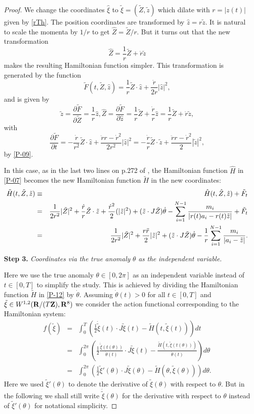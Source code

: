 \documentclass[11pt]{article}
\def\be{\begin{equation}}
\def\ee{\end{equation}}
\def\bea{\begin{eqnarray}}
\def\eea{\end{eqnarray}}
\def\nn{\nonumber}
\def\lb{\label}
\def\pt{\partial}
\def\R{{\bf R}}
\def\Z{{\bf Z}}
\def\th{{\theta}}
\def\td#1{\tilde{#1}}
\begin{document}
\begin{proof}
  We change the coordinates $\hat{\xi}$ to
  $\td{\xi}=(\td{Z},\td{z})$
  which dilate with $r=|z(t)|$ given by \eqref{rTh}. The position coordinates are transformed by $\hat{z} = r\td{z}$.
  It is natural to scale the momenta by $1/r$ to get $\hat{Z}=\td{Z}/r$. 
  But it
  turns out that the new transformation
  \be  \hat{Z}=\frac{1}{r}\td{Z}+\dot{r}\td{z}  \lb{P-09}\ee
  makes the resulting Hamiltonian function simpler. 
  This transformation is generated by the function
  \be  \td{F}(t, \td{Z}, \hat{z})
    = \frac{1}{r}\td{Z}\cdot\hat{z} + \frac{\dot{r}}{2r}|\hat{z}|^2,
                          \lb{P-10}\ee
  and is given by
  \be
  \td{z} = \frac{\pt \td{F}}{\pt \td{Z}} = \frac{1}{r}\hat{z},   
  \hat{Z} = \frac{\pt \td{F}}{\pt \hat{z}} = \frac{1}{r}\td{Z}+\frac{\dot{r}}{r}\hat{z} = \frac{1}{r}\td{Z}+\dot{r}\td{z}, \nn\ee
  with
  \be  \frac{\pt \td{F}}{\pt t}
  = -\frac{\dot{r}}{r^2}\td{Z}\cdot\hat{z}
         + \frac{\ddot{r}r-\dot{r}^2}{2r^2}|\hat{z}|^2
  = -\frac{\dot{r}}{r}\td{Z}\cdot\td{z}
         + \frac{\ddot{r}r-\dot{r}^2}{2}|\td{z}|^2,     \lb{P-11}\ee
  by \eqref{P-09}.
  
  In this case, as in the last two lines on p.272 of \cite{MS}, the
  Hamiltonian function $\hat{H}$ in \eqref{P-07}
  becomes the new Hamiltonian function $\td{H}$ in the new coordinates:
  \bea
  \td{H}(t,\td{Z},\td{z})
  &\equiv& \hat{H}(t, \hat{Z}, \hat{z}) + \td{F}_t \nn\\
  &=& \frac{1}{2r^2}|\td{Z}|^2 + \frac{\dot{r}}{r}\td{Z}\cdot\td{z}
     + \frac{\dot{r}^2}{2}(|\td{z}|^2) + (\td{z}\cdot J\td{Z})\dot{\th}
     - \sum_{i=1}^{N-1}{m_i\over|r(t)a_i-r(t)\tilde{z}|} + \tilde{F}_t   \nn\\
  &=& \frac{1}{2r^2}|\td{Z}|^2+ \frac{r\ddot{r}}{2}|\td{z}|^2
     +(\td{z}\cdot J\td{Z})\dot{\th}
     - \frac{1}{r}\sum_{i=1}^{N-1}{m_i\over|a_i-\tilde{z}|}.   \lb{P-12}\eea
  
  
  {\bf Step 3.} {\it Coordinates via the true anomaly $\th$ as the independent variable.}
  
  Here we use the true anomaly $\th\in [0,2\pi]$ as an independent variable instead of $t\in [0,T]$ to simplify
  the study. This is achieved by dividing the Hamiltonian function $\td{H}$ in \eqref{P-12} by $\dot{\th}$. Assuming
  $\dot{\th}(t)>0$ for all $t\in [0,T]$ and  $\td{\xi}\in W^{1,2}(\R/(T\Z), \R^8)$ we consider the action functional
  corresponding to the Hamiltonian system:
  \bea f(\td{\xi})
  &=& \int_0^T(\frac{1}{2}\dot{\td{\xi}}(t)\cdot J\td{\xi}(t) - \td{H}(t,\td{\xi}(t))) dt  \nn\\
  &=& \int_0^{2\pi}\left(\frac{1}{2}\frac{\dot{\td{\xi}}(t(\th))}{\dot{\th}(t)}\cdot J\td{\xi}(t)
            - \frac{\td{H}(t,\td{\xi}(t(\th)))}{\dot{\th}(t)}\right) d\th  \nn\\
  &=& \int_0^{2\pi}\left(\frac{1}{2}\td{\xi}'(\th)\cdot J\td{\xi}(\th) - \td{H}(\th,\td{\xi}(\th))\right) d\th.  \nn\eea
  Here we used $\td{\xi}'(\th)$ to denote the derivative of $\td{\xi}(\th)$ with respect to $\th$. But
  in the following we shall still write $\dot{\td{\xi}}(\th)$ for the derivative with respect to $\th$ instead of
  $\td{\xi}'(\th)$ for notational simplicity.
  

\end{proof}
\end{document}
